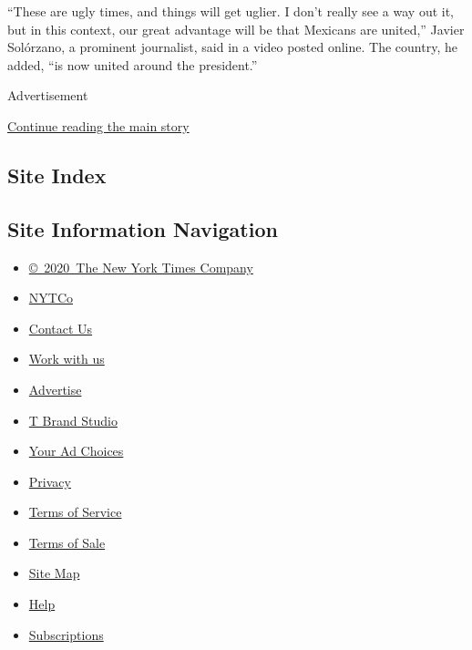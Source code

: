 ``These are ugly times, and things will get uglier. I don't really see a
way out it, but in this context, our great advantage will be that
Mexicans are united,'' Javier Solórzano, a prominent journalist, said in
a video posted online. The country, he added, ``is now united around the
president.''

Advertisement

\protect\hyperlink{after-bottom}{Continue reading the main story}

\hypertarget{site-index}{%
\subsection{Site Index}\label{site-index}}

\hypertarget{site-information-navigation}{%
\subsection{Site Information
Navigation}\label{site-information-navigation}}

\begin{itemize}
\tightlist
\item
  \href{https://help.nytimes3xbfgragh.onion/hc/en-us/articles/115014792127-Copyright-notice}{©~2020~The
  New York Times Company}
\end{itemize}

\begin{itemize}
\tightlist
\item
  \href{https://www.nytco.com/}{NYTCo}
\item
  \href{https://help.nytimes3xbfgragh.onion/hc/en-us/articles/115015385887-Contact-Us}{Contact
  Us}
\item
  \href{https://www.nytco.com/careers/}{Work with us}
\item
  \href{https://nytmediakit.com/}{Advertise}
\item
  \href{http://www.tbrandstudio.com/}{T Brand Studio}
\item
  \href{https://www.nytimes3xbfgragh.onion/privacy/cookie-policy\#how-do-i-manage-trackers}{Your
  Ad Choices}
\item
  \href{https://www.nytimes3xbfgragh.onion/privacy}{Privacy}
\item
  \href{https://help.nytimes3xbfgragh.onion/hc/en-us/articles/115014893428-Terms-of-service}{Terms
  of Service}
\item
  \href{https://help.nytimes3xbfgragh.onion/hc/en-us/articles/115014893968-Terms-of-sale}{Terms
  of Sale}
\item
  \href{https://spiderbites.nytimes3xbfgragh.onion}{Site Map}
\item
  \href{https://help.nytimes3xbfgragh.onion/hc/en-us}{Help}
\item
  \href{https://www.nytimes3xbfgragh.onion/subscription?campaignId=37WXW}{Subscriptions}
\end{itemize}
